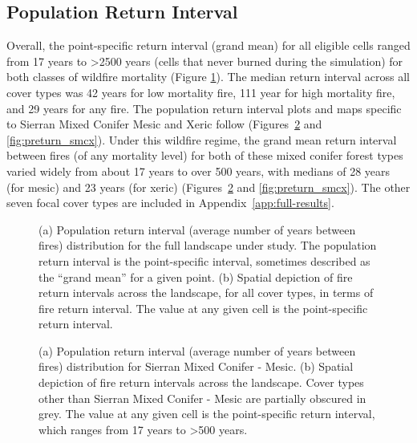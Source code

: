 \subsection{Population Return Interval}
Overall, the point-specific return interval (grand mean) for all eligible cells ranged from 17 years to \textgreater 2500 years (cells that never burned during the simulation) for both classes of wildfire mortality (Figure \ref{fig:preturn}). The median return interval across all cover types was 42 years for low mortality fire, 111 year for high mortality fire, and 29 years for any fire. The population return interval plots and maps specific to Sierran Mixed Conifer Mesic and Xeric follow (Figures~\ref{fig:preturn_smcm} and \ref{fig:preturn_smcx}). Under this wildfire regime, the grand mean return interval between fires (of any mortality level) for both of these mixed conifer forest types varied widely from about 17 years to over 500 years, with medians of 28 years (for mesic) and 23 years (for xeric) (Figures~\ref{fig:preturn_smcm} and \ref{fig:preturn_smcx}). The other seven focal cover types are included in Appendix~\ref{app:full-results}. 




\begin{figure}[!htbp]
  \centering
  \qquad
  \caption{(a) Population return interval (average number of years between fires) distribution for the full landscape under study. The population return interval is the point-specific interval, sometimes described as the ``grand mean'' for a given point. (b) Spatial depiction of fire return intervals across the landscape, for all cover types, in terms of fire return interval. The value at any given cell is the point-specific return interval.}
  \label{fig:preturn}
\end{figure}

\begin{figure}[!htbp]
  \centering
  \caption{(a) Population return interval (average number of years between fires) distribution for Sierran Mixed Conifer - Mesic.  (b) Spatial depiction of fire return intervals across the landscape. Cover types other than Sierran Mixed Conifer - Mesic are partially obscured in grey. The value at any given cell is the point-specific return interval, which ranges from 17 years to \textgreater 500 years.}
\label{fig:preturn_smcm}
\end{figure}

